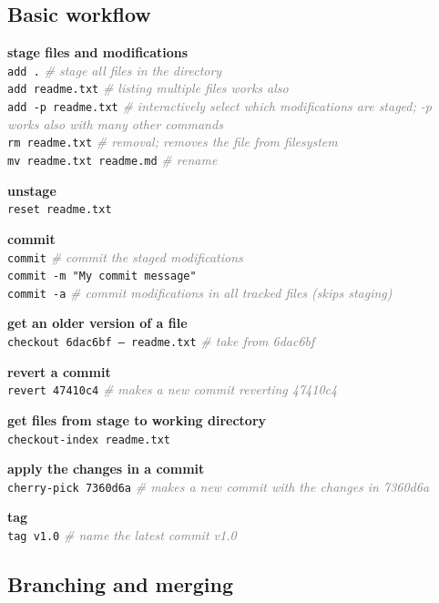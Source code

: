 \documentclass[landscape]{article}
\newcommand*{\prog}{\texttt}
\newcommand*{\proge}[1]{\textcolor{gray}{\textit{\# #1}}}
\begin{document}
\begin{multicols*}{3}
  \subsection{Basic workflow}
  \begin{myitemize}
    \item \textbf{stage files and modifications}\\
      \prog{add .} \proge{stage all files in the directory}\\
      \prog{add readme.txt} \proge{listing multiple files works also}\\
      \prog{add -p readme.txt} \proge{interactively select which modifications are staged; -p works also with many other commands}\\
      \prog{rm readme.txt} \proge{removal; removes the file from filesystem}\\
      \prog{mv readme.txt readme.md} \proge{rename}
    \item \textbf{unstage}\\
      \prog{reset readme.txt}
    \item \textbf{commit}\\
      \prog{commit} \proge{commit the staged modifications}\\
      \prog{commit -m "My commit message"}\\
      \prog{commit -a} \proge{commit modifications in all tracked files (skips staging)}
    \item \textbf{get an older version of a file}\\
      \prog{checkout 6dac6bf -- readme.txt} \proge{take from 6dac6bf}
    \item \textbf{revert a commit}\\
      \prog{revert 47410c4} \proge{makes a new commit reverting 47410c4}
    \item \textbf{get files from stage to working directory}\\
      \prog{checkout-index readme.txt}
    \item \textbf{apply the changes in a commit}\\
      \prog{cherry-pick 7360d6a} \proge{makes a new commit with the changes in 7360d6a}
    \item \textbf{tag}\\
      \prog{tag v1.0} \proge{name the latest commit v1.0}
  \end{myitemize}

  \subsection{Branching and merging}


\end{multicols*}
\end{document}
